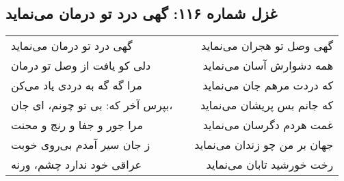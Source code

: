 \begin{center}
\section*{غزل شماره ۱۱۶: گهی درد تو درمان می‌نماید}
\label{sec:116}
\begin{longtable}{l p{0.5cm} r}
گهی درد تو درمان می‌نماید
&&
گهی وصل تو هجران می‌نماید
\\
دلی کو یافت از وصل تو درمان
&&
همه دشوارش آسان می‌نماید
\\
مرا گه گه به دردی یاد می‌کن
&&
که دردت مرهم جان می‌نماید
\\
بپرس آخر که: بی تو چونم، ای جان،
&&
که جانم بس پریشان می‌نماید
\\
مرا جور و جفا و رنج و محنت
&&
غمت هردم دگرسان می‌نماید
\\
ز جان سیر آمدم بی‌روی خوبت
&&
جهان بر من چو زندان می‌نماید
\\
عراقی خود ندارد چشم، ورنه
&&
رخت خورشید تابان می‌نماید
\\
\end{longtable}
\end{center}
